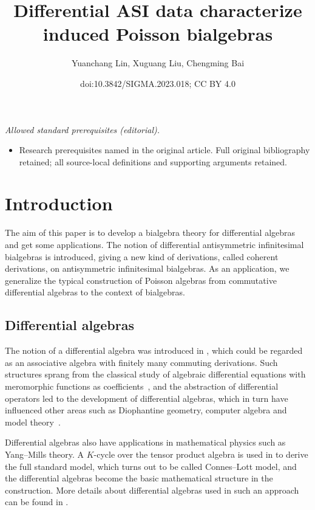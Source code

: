 \documentclass[10pt,a4paper]{amsart}
\title{Differential ASI data characterize induced Poisson bialgebras}
\author{Yuanchang Lin, Xuguang Liu, Chengming Bai}
\date{doi:10.3842/SIGMA.2023.018; CC BY 4.0}
\numberwithin{equation}{section}
\begin{document}
\maketitle
\noindent\textit{Allowed standard prerequisites (editorial).}\begin{itemize}
\item Research prerequisites named in the original article. Full original bibliography retained; all source-local definitions and supporting arguments retained.
\end{itemize}\medskip
\section{Introduction}

The aim of this paper is to develop a bialgebra theory for differential algebras and get some applications.
The notion of differential antisymmetric infinitesimal bialgebras is introduced,
giving a new kind of derivations, called coherent derivations, on antisymmetric infinitesimal bialgebras.
As an application, we generalize the typical construction of Poisson algebras from commutative differential algebras to the context of bialgebras.

\subsection{Differential algebras}

The notion of a differential algebra was introduced in \cite{Ritt1950Differential},
which could be regarded as an associative algebra with finitely many commuting derivations.
Such structures sprang from the classical study of algebraic differential equations with meromorphic functions as coefficients~\cite{kolchin1973differential},
and the abstraction of differential operators led to the development of differential algebras,
which in turn have influenced other areas such as Diophantine geometry, computer algebra and model theory~\cite{aschenbrenner2017asymptotic, buium1975differential, pillay1995model}.

Differential algebras also have applications in mathematical physics such as Yang--Mills theory.
A $K$-cycle over the tensor product algebra is used in
\cite{connes1992metric} to derive the full standard model, which
turns out to be called Connes--Lott model, and the differential
algebras become the basic mathematical structure in the
construction. More details about differential algebras used in
such an approach can be found in \cite{connes1994non, iochum1996yang, kalau1996hamilton, kalau1995differential, matthes1996structure}.
\end{document}

